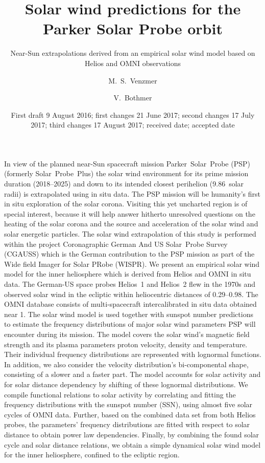 
\title{Solar wind predictions for the Parker Solar Probe orbit}
\subtitle{Near-Sun extrapolations derived from an empirical solar wind model based on Helios and OMNI observations}

\author{M.~S.~Venzmer
\and V.~Bothmer}


\date{First draft 9 August 2016; first changes 21 June 2017; second changes 17 July 2017; third changes 17 August 2017; received date; accepted date}

\abstract
{In view of the planned near-Sun spacecraft mission Parker~Solar~Probe (PSP) (formerly Solar~Probe~Plus) the solar wind environment for its prime mission duration (2018--2025) and down to its intended closest perihelion (\num{9.86}~solar radii) is extrapolated using in situ data. The PSP mission will be humanity's first in situ exploration of the solar corona. Visiting this yet uncharted region is of special interest, because it will help answer hitherto unresolved questions on the heating of the solar corona and the source and acceleration of the solar wind and solar energetic particles. The solar wind extrapolation of this study is performed within the project Coronagraphic German And US Solar~Probe Survey (CGAUSS) which is the German contribution to the PSP mission as part of the Wide field Imager for Solar PRobe (WISPR).}	%
{We present an empirical solar wind model for the inner heliosphere which is derived from Helios and OMNI in situ data. The German-US space probes Helios~1 and Helios~2 flew in the 1970s and observed solar wind in the ecliptic within heliocentric distances of \SIrange{0.29}{0.98}{\au}. The OMNI database consists of multi-spacecraft intercalibrated in situ data obtained near \SI{1}{\au}. The solar wind model is used together with sunspot number predictions to estimate the frequency distributions of major solar wind parameters PSP will encounter during its mission.}	%
{The model covers the solar wind's magnetic field strength and its plasma parameters proton velocity, density and temperature.
Their individual frequency distributions are represented with lognormal functions. In addition, we also consider the velocity distribution's bi-componental shape, consisting of a slower and a faster part. The model accounts for solar activity and for solar distance dependency by shifting of these lognormal distributions. We compile functional relations to solar activity by correlating and fitting the frequency distributions with the sunspot number (SSN), using almost five solar cycles of OMNI data. Further, based on the combined data set from both Helios probes, the parameters' frequency distributions are fitted with respect to solar distance to obtain power law dependencies. Finally, by combining the found solar cycle and solar distance relations, we obtain a simple dynamical solar wind model for the inner heliosphere, confined to the ecliptic region.}	%

